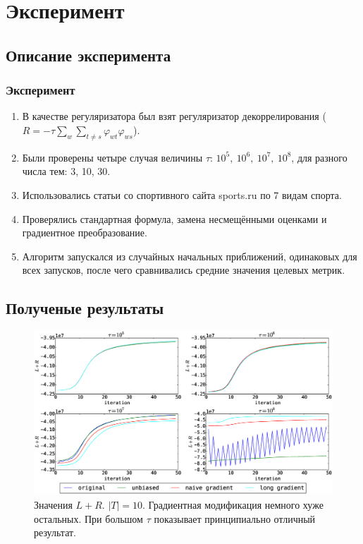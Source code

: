 \documentclass[utf8]{beamer}
\renewcommand{\phi}{\varphi}
\begin{document}
\section{Эксперимент}
\subsection{Описание эксперимента}
	
\begin{frame}
\frametitle{Эксперимент}
		
\begin{enumerate}
\item В качестве регуляризатора был взят регуляризатор декоррелирования ($R = -\tau\sum\limits_w \sum\limits_{t \neq s} \phi_{wt} \phi_{ws}$).
\item Были проверены четыре случая величины $\tau$: $10^5,~10^6,~10^7,~10^8$, для разного числа тем: 3, 10, 30.
\item Использовались статьи со спортивного сайта sports.ru по 7 видам спорта.
\item Проверялись стандартная формула, замена несмещёнными оценками и градиентное преобразование.
\item Алгоритм  запускался из случайных начальных приближений, одинаковых для всех запусков, после чего сравнивались средние значения целевых метрик.
\end{enumerate}
\end{frame}

\subsection{Полученые результаты}
\captionsetup{labelformat=simple} 
\begin{frame}
\begin{figure}[h]
	\centering  	
	\caption{Значения $L + R$. $|T| = 10$. Градиентная модификация немного хуже остальных. При большом $\tau$ показывает принципиально отличный результат.} 
	\medskip
	\includegraphics[width=0.9\linewidth]{presentation_pictures/topics_10_LR_values.eps}  
\end{figure}
\end{frame}
\end{document}
